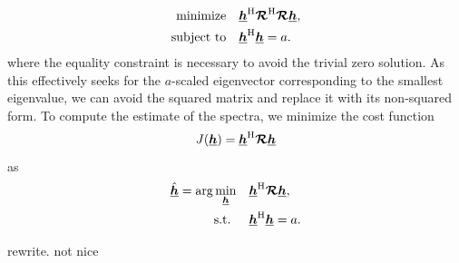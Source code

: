 \documentclass{article}
\newcommand{\hf}{\underline{\bm{h}}}
\newcommand{\Rf}{\bm{\mathcal{R}}}
\begin{document}
\begin{align}
    \operatorname{minimize} \quad & \hf^\herm \Rf^\herm \Rf \hf, \label{eq:frequency_domain:least_squares}\\
    \text{subject to} \quad & \hf^\herm \hf = a.
\end{align}
where the equality constraint is necessary to avoid the trivial zero solution.
As this effectively seeks for the \(a\)-scaled eigenvector corresponding to the smallest eigenvalue, we can avoid the squared matrix and replace it with its non-squared form.
To compute the estimate of the spectra, we minimize the cost function
\begin{equation}
    J(\hf) = \hf^\herm \Rf \hf\label{eq:frequency_domain:cost_function}
\end{equation}
as
\begin{align}
    \hat{\hf} = \arg \min_{\hf} \quad &\hf^\herm \Rf \hf, \label{eq:frequency_domain:min_prob}\\
    \text{s.t. } \quad &\hf^\herm \hf = a.
\end{align}
\begin{attention}
    rewrite. not nice
\end{attention}

\end{document}
